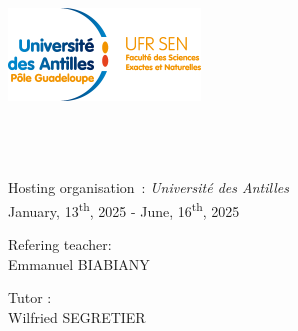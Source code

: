 \begin{titlepage}
	\begin{center}
		\includegraphics[scale=1.80]{../imgs/logo_ufr_sen.png} \\[2cm]
		\hspace{2cm}

		\HRule \\[0.4cm]
		\@title
		\HRule \\[1cm]

		\@author \\ [1.5cm]

		{\large Hosting organisation~: \textsl{Université des Antilles}} \\[1.5cm]

		{\large January, 13\textsuperscript{th}, 2025 - June, 16\textsuperscript{th}, 2025} \\ [2cm]

		\begin{minipage}{0.7\textwidth}
			\begin{flushleft}
				Refering teacher:\\
				\hspace{0.2cm}  Emmanuel \textsc{BIABIANY}
			\end{flushleft}
		\end{minipage}

		\vspace{-1cm}
		\hspace{9cm}
		\begin{minipage}{0.3\textwidth}
			\begin{flushleft}
				Tutor :\\
				\hspace{0.2cm} Wilfried \textsc{SEGRETIER}
			\end{flushleft}
		\end{minipage}\\[4cm]

		\@date
	\end{center}
\end{titlepage}
